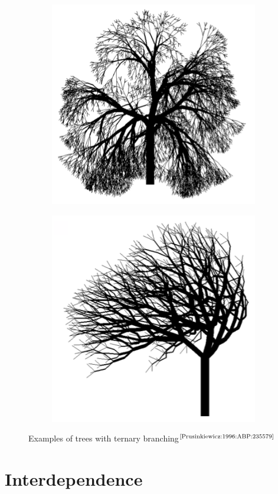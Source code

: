 \documentclass[letterpaper,twoside,11pt]{article}
\begin{document}
\begin{multicols}{2}
\begin{figure}[H]
  \centering
  \begin{subfigure}{.5\textwidth}
    \centering
    \includegraphics[width=.63\textwidth]{trees1.png}
    \caption{}
  \end{subfigure}%
\end{figure}
\begin{figure}[H]
\ContinuedFloat
  \begin{subfigure}{.5\textwidth}
    \centering
    \includegraphics[width=.63\textwidth]{trees2.png}
    \caption{}
  \end{subfigure}
  \caption{Examples of trees with ternary branching$^{\text{\cite{Prusinkiewicz:1996:ABP:235579}}}$}
   \label{fig:ttrees}\end{figure}

\section{Interdependence} %


\end{multicols}
\end{document}
